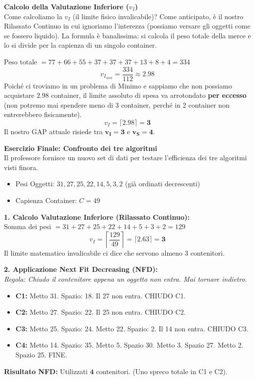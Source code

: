 \documentclass[12pt, a4paper]{article}
\newcommand{\separatore}{\noindent{\color{titlecolor!50}\rule{\textwidth}{0.6pt}}}
\begin{document}
	\vspace{0.4cm}
	\textbf{Calcolo della Valutazione Inferiore ($v_I$)}\\
	Come calcoliamo la $v_I$ (il limite fisico invalicabile)? Come anticipato, è il nostro Rilassato Continuo in cui ignoriamo l'interezza (possiamo versare gli oggetti come se fossero liquido).
	La formula è banalissima: si calcola il peso totale della merce e lo si divide per la capienza di un singolo container.
	
	Peso totale $= 77 + 66 + 55 + 37 + 37 + 37 + 13 + 8 + 4 = 334$
	\[
	v_{I_{cont}} = \frac{334}{112} \approx 2.98
	\]
	Poiché ci troviamo in un problema di Minimo e sappiamo che non possiamo acquistare $2.98$ container, il limite assoluto di spesa va arrotondato \textbf{per eccesso} (non potremo mai spendere meno di 3 container, perché in 2 container non entrerebbero fisicamente).
	\[
	v_I = \lceil 2.98 \rceil = \mathbf{3}
	\]
	Il nostro GAP attuale risiede tra $\mathbf{v_I = 3}$ e $\mathbf{v_S = 4}$. 
	
	\vspace{0.6cm}
	\separatore
	\vspace{0.4cm}
	
	\textbf{Esercizio Finale: Confronto dei tre algoritmi}\\
	Il professore fornisce un nuovo set di dati per testare l'efficienza dei tre algoritmi visti finora.
	\begin{itemize}
		\item Pesi Oggetti: $31, 27, 25, 22, 14, 5, 3, 2$ (già ordinati decrescenti)
		\item Capienza Container: $C = 49$
	\end{itemize}
	
	\textbf{1. Calcolo Valutazione Inferiore (Rilassato Continuo):}\\
	Somma dei pesi $= 31 + 27 + 25 + 22 + 14 + 5 + 3 + 2 = 129$
	\[ v_I = \left\lceil \frac{129}{49} \right\rceil = \lceil 2.63 \rceil = \mathbf{3} \]
	Il limite matematico invalicabile ci dice che servono almeno 3 contenitori.
	
	\vspace{0.2cm}
	\textbf{2. Applicazione Next Fit Decreasing (NFD):}\\
	\textit{Regola: Chiudo il contenitore appena un oggetto non entra. Mai tornare indietro.}
	\begin{itemize}[label=$\circ$, itemsep=1pt, leftmargin=1.5cm]
		\item \textbf{C1:} Metto 31. Spazio: 18. Il 27 non entra. CHIUDO C1.
		\item \textbf{C2:} Metto 27. Spazio: 22. Il 25 non entra. CHIUDO C2.
		\item \textbf{C3:} Metto 25. Spazio: 24. Metto 22. Spazio: 2. Il 14 non entra. CHIUDO C3.
		\item \textbf{C4:} Metto 14. Spazio: 35. Metto 5. Spazio 30. Metto 3. Spazio 27. Metto 2. Spazio 25. FINE.
	\end{itemize}
	\textbf{Risultato NFD:} Utilizzati $\mathbf{4}$ contenitori. (Uno spreco totale in C1 e C2).
	
\end{document}
